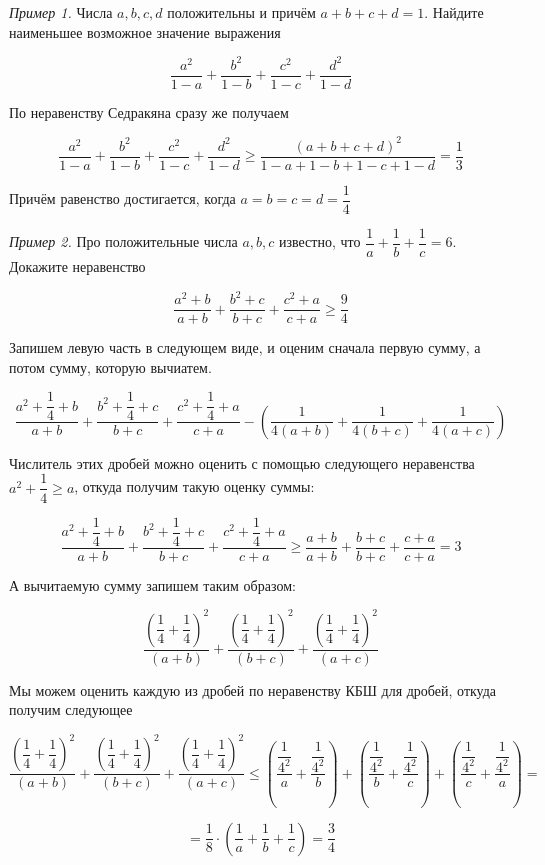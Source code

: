 \textit{Пример 1.}
Числа $a, b, c, d$ положительны и причём $a+b+c+d=1$. Найдите наименьшее возможное значение выражения

$$
\dfrac{a^2}{1-a}+\dfrac{b^2}{1-b}+\dfrac{c^2}{1-c}+\dfrac{d^2}{1-d}
$$

По неравенству Седракяна сразу же получаем

$$
\dfrac{a^2}{1-a}+\dfrac{b^2}{1-b}+\dfrac{c^2}{1-c}+\dfrac{d^2}{1-d} \geqslant \dfrac{(a+b+c+d)^2}{1-a+1-b+1-c+1-d}=\dfrac{1}{3}
$$

Причём равенство достигается, когда $a = b = c = d = \dfrac{1}{4}$

\textit{Пример 2.}
Про положительные числа $a, b, c$ известно, что $\dfrac{1}{a}+\dfrac{1}{b}+\dfrac{1}{c}=6$. Докажите неравенство

$$
\dfrac{a^2+b}{a+b}+\dfrac{b^2+c}{b+c}+\dfrac{c^2+a}{c+a} \geqslant \dfrac{9}{4}
$$

Запишем левую часть в следующем виде, и оценим сначала первую сумму, а потом сумму, которую вычиатем.

$$
\dfrac{a^2+\dfrac{1}{4}+b}{a+b}+\dfrac{b^2+\dfrac{1}{4}+c}{b+c}+\dfrac{c^2+\dfrac{1}{4}+a}{c+a}-\left(\dfrac{1}{4(a+b)}+\dfrac{1}{4(b+c)}+\dfrac{1}{4(a+c)}\right)
$$


Числитель этих дробей можно оценить с помощью следующего неравенства $a^2+\dfrac{1}{4} \geqslant a$, откуда получим такую оценку суммы:

$$
\dfrac{a^2+\dfrac{1}{4}+b}{a+b}+\dfrac{b^2+\dfrac{1}{4}+c}{b+c}+\dfrac{c^2+\dfrac{1}{4}+a}{c+a} \geqslant \dfrac{a+b}{a+b}+\dfrac{b+c}{b+c}+\dfrac{c+a}{c+a}=3
$$


А вычитаемую сумму запишем таким образом:

$$
\dfrac{\left(\dfrac{1}{4}+\dfrac{1}{4}\right)^2}{(a+b)}+\dfrac{\left(\dfrac{1}{4}+\dfrac{1}{4}\right)^2}{(b+c)}+\dfrac{\left(\dfrac{1}{4}+\dfrac{1}{4}\right)^2}{(a+c)}
$$


Мы можем оценить каждую из дробей по неравенству КБШ для дробей, откуда получим следующее

$$
\dfrac{\left(\dfrac{1}{4}+\dfrac{1}{4}\right)^2}{(a+b)}+\dfrac{\left(\dfrac{1}{4}+\dfrac{1}{4}\right)^2}{(b+c)}+\dfrac{\left(\dfrac{1}{4}+\dfrac{1}{4}\right)^2}{(a+c)} \leqslant\left(\dfrac{\dfrac{1}{4^2}}{a}+\dfrac{\dfrac{1}{4^2}}{b}\right)+\left(\dfrac{\dfrac{1}{4^2}}{b}+\dfrac{\dfrac{1}{4^2}}{c}\right)+\left(\dfrac{\dfrac{1}{4^2}}{c}+\dfrac{\dfrac{1}{4^2}}{a}\right)=
$$

$$
=\dfrac{1}{8} \cdot\left(\dfrac{1}{a}+\dfrac{1}{b}+\dfrac{1}{c}\right)=\dfrac{3}{4}
$$


